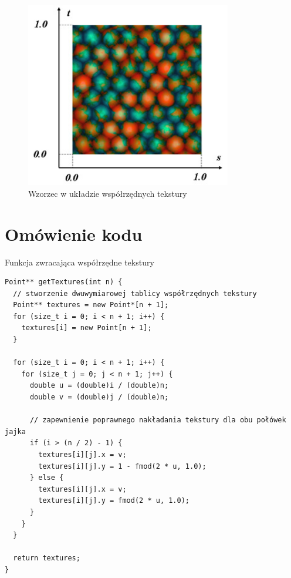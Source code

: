 \documentclass[12pt,a4paper,titlepage]{article}
\begin{document}
\begin{figure}[H]
\centering
\includegraphics[width = 9cm]{images/coordinates.jpg}
\caption{Wzorzec w układzie współrzędnych tekstury}
\label{fig:koordynaty}
\end{figure}

\section{Omówienie kodu}

\begin{listing}[H]
\caption{Funkcja zwracająca współrzędne tekstury}
\begin{verbatim}
Point** getTextures(int n) {
  // stworzenie dwuwymiarowej tablicy współrzędnych tekstury
  Point** textures = new Point*[n + 1];
  for (size_t i = 0; i < n + 1; i++) {
    textures[i] = new Point[n + 1];
  }

  for (size_t i = 0; i < n + 1; i++) {
    for (size_t j = 0; j < n + 1; j++) {
      double u = (double)i / (double)n;
      double v = (double)j / (double)n;

      // zapewnienie poprawnego nakładania tekstury dla obu połówek jajka
      if (i > (n / 2) - 1) {
        textures[i][j].x = v;
        textures[i][j].y = 1 - fmod(2 * u, 1.0);
      } else {
        textures[i][j].x = v;
        textures[i][j].y = fmod(2 * u, 1.0);
      }
    }
  }

  return textures;
}
\end{verbatim}
\end{listing}
\end{document}
